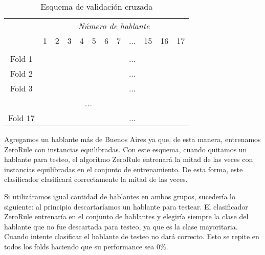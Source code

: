 \begin{table}[H]
	\centering
	\begin{tabular}{cccccccccccc}
		& \multicolumn{11}{c}{\textit{Número de hablante}} \\
		& 1 & 2 & 3 & 4 & 5 & 6 & 7 & ... & 15 & 16 & 17 \\
		\hline \\
		Fold 1 &\mycirc[red] & \mycirc[blue] & \mycirc[blue]  & \mycirc[blue]  & \mycirc[blue]  & \mycirc[blue]  & \mycirc[blue] & ... & \mycirc[blue] & \mycirc[blue] & \mycirc[blue]  \\
		
		Fold 2 &\mycirc[blue] & \mycirc[red] & \mycirc[blue]  & \mycirc[blue]  & \mycirc[blue]  & \mycirc[blue]  & \mycirc[blue] & ... & \mycirc[blue] & \mycirc[blue] & \mycirc[blue]  \\
		
		Fold 3 &\mycirc[blue] & \mycirc[blue] & \mycirc[red]  & \mycirc[blue]  & \mycirc[blue]  & \mycirc[blue]  & \mycirc[blue] & ... & \mycirc[blue] & \mycirc[blue] & \mycirc[blue]  \\
		
		\multicolumn{11}{c}{\textit{...}}	\\
		
		Fold 17 &\mycirc[blue] & \mycirc[blue] & \mycirc[blue]  & \mycirc[blue]  & \mycirc[blue]  & \mycirc[blue]  & \mycirc[blue] & ... & \mycirc[blue] & \mycirc[blue] & \mycirc[red]   \\
		
	\end{tabular}
	\caption{Esquema de validación cruzada}
	\label{PAH_esq_cv}
\end{table}

Agregamos un hablante más de Buenos Aires ya que, de esta manera, entrenamos ZeroRule con instancias equilibradas. Con este esquema, cuando quitamos un hablante para testeo, el algoritmo ZeroRule entrenará la mitad de las veces con instancias equilibradas en el conjunto de entrenamiento. De esta forma, este clasificador clasificará correctamente la mitad de las veces.

Si utilizáramos igual cantidad de hablantes en ambos grupos, sucedería lo siguiente: al principio  descartaríamos un hablante para testear. El clasificador ZeroRule entrenaría en el conjunto de hablantes y elegiría siempre la clase del hablante que no fue descartada para testeo, ya que es la clase mayoritaria. Cuando intente clasificar el hablante de testeo no dará correcto. Esto se repite en todos los folds haciendo que su performance sea $0\%$.

